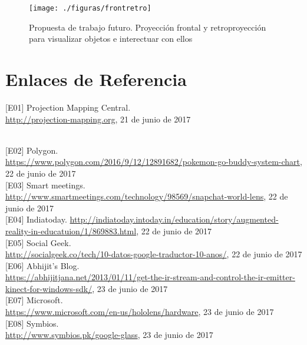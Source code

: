 \documentclass[a4paper,openright,12pt]{report}
\begin{document}
\begin{figure}[H]
	\centering
	\texttt{[image: ./figuras/frontretro]}
	\caption{Propuesta de trabajo futuro. Proyección frontal y retroproyección para visualizar objetos e interectuar con ellos}\label{fig:frontretro}
\end{figure}

\cleardoublepage
{}


\chapter*{Enlaces de Referencia}
\hypertarget{e01}{
[E01] Projection Mapping Central. \\\url{http://projection-mapping.org}, 21 de junio de 2017}\\

\hypertarget{e02}{[E02] Polygon. \\\url{https://www.polygon.com/2016/9/12/12891682/pokemon-go-buddy-system-chart}, 22 de junio de 2017}\\

\hypertarget{e03}{[E03] Smart meetings. \url{http://www.smartmeetings.com/technology/98569/snapchat-world-lens}, 22 de junio de 2017}\\

\hypertarget{e04}{[E04] Indiatoday. \url{http://indiatoday.intoday.in/education/story/augmented-reality-in-educatuion/1/869883.html}, 22 de junio de 2017}\\

\hypertarget{e05}{[E05] Social Geek.\\ \url{http://socialgeek.co/tech/10-datos-google-traductor-10-anos/}, 22 de junio de 2017}\\

\hypertarget{e06}{[E06] Abhijit's Blog.\\ \url{https://abhijitjana.net/2013/01/11/get-the-ir-stream-and-control-the-ir-emitter-kinect-for-windows-sdk/}, 23 de junio de 2017}\\

\hypertarget{e07}{[E07] Microsoft.\\ \url{https://www.microsoft.com/en-us/hololens/hardware}, 23 de junio de 2017}\\

\hypertarget{e08}{[E08] Symbios.\\ \url{http://www.symbios.pk/google-glass}, 23 de junio de 2017}\\
\end{document}
